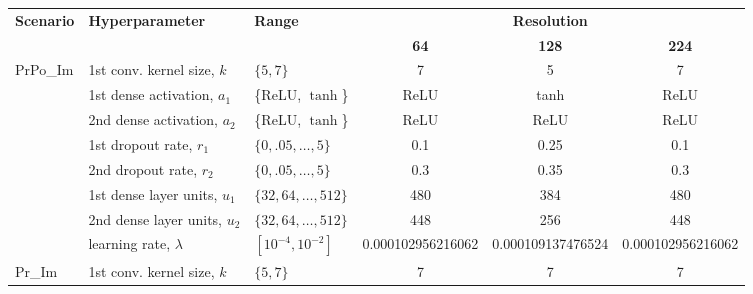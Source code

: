 \documentclass[Journal,letterpaper, SingleSpace, InsideFigs]{ascelike-new}
\begin{document}
\begin{table}[ht!]\small
    \centering
\begin{tabular}{@{}lllccc@{}}
\toprule
\multirow{2}{*}{\textbf{Scenario}} & \multirow{2}{*}{\textbf{Hyperparameter}} & \multirow{2}{*}{\textbf{Range}} & \multicolumn{3}{c}{\textbf{Resolution}} \\ \cmidrule(l){4-6} 
                          &                              &                           & \textbf{64}             & \textbf{128}            & \textbf{224}            \\ \midrule
\multirow{8}{*}{PrPo\_Im}  & 1st conv. kernel size, $k$   & $\{5, 7\}$                & 7                       & 5                       & 7                       \\
                          & 1st dense activation, $a_1$  & \{ReLU, $\tanh$\}         & ReLU                    & tanh                    & ReLU                    \\
                          & 2nd dense activation, $a_2$  & \{ReLU, $\tanh$\}         & ReLU                    & ReLU                    & ReLU                    \\
                          & 1st dropout rate, $r_1$      & $\{0, .05, \ldots, 5\}$   & 0.1                     & 0.25                    & 0.1                     \\
                          & 2nd dropout rate, $r_2$      & $\{0, .05, \ldots, 5\}$   & 0.3                     & 0.35                    & 0.3                     \\
                          & 1st dense layer units, $u_1$ & $\{32, 64, \ldots, 512\}$ & 480                     & 384                     & 480                     \\
                          & 2nd dense layer units, $u_2$ & $\{32, 64, \ldots, 512\}$ & 448                     & 256                     & 448                     \\
                          & learning rate, $\lambda$     & $[10^{-4}, 10^{-2}]$      & \num{0.000102956216062} & \num{0.000109137476524} & \num{0.000102956216062} \\\midrule
\multirow{8}{*}{Pr\_Im}    & 1st conv. kernel size, $k$   & $\{5, 7\}$                & 7                       & 7                       & 7                       \\

\end{tabular}
\end{table}
\end{document}
